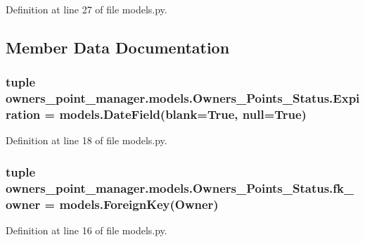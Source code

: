 Definition at line 27 of file models.\-py.



\subsection{Member Data Documentation}
\hypertarget{classowners__point__manager_1_1models_1_1Owners__Points__Status_af05df99f421ca8947ef360570d74c4e9}{
\subsubsection[{Expiration}]{\setlength{\rightskip}{0pt plus 5cm}tuple owners\-\_\-point\-\_\-manager.\-models.\-Owners\-\_\-\-Points\-\_\-\-Status.\-Expiration = models.\-Date\-Field(blank=True, null=True)\hspace{0.3cm}{\ttfamily [static]}}}\label{classowners__point__manager_1_1models_1_1Owners__Points__Status_af05df99f421ca8947ef360570d74c4e9}


Definition at line 18 of file models.\-py.

\hypertarget{classowners__point__manager_1_1models_1_1Owners__Points__Status_a8ffb5a3f42d5c780ef974bb11236604a}{
\subsubsection[{fk\-\_\-owner}]{\setlength{\rightskip}{0pt plus 5cm}tuple owners\-\_\-point\-\_\-manager.\-models.\-Owners\-\_\-\-Points\-\_\-\-Status.\-fk\-\_\-owner = models.\-Foreign\-Key({\bf Owner})\hspace{0.3cm}{\ttfamily [static]}}}\label{classowners__point__manager_1_1models_1_1Owners__Points__Status_a8ffb5a3f42d5c780ef974bb11236604a}


Definition at line 16 of file models.\-py.

